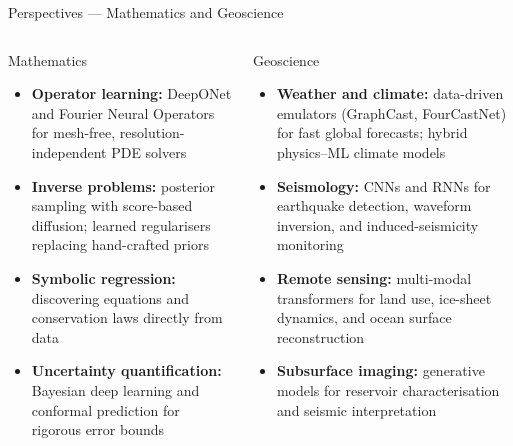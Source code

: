 \documentclass[aspectratio=169,11pt]{beamer}
\begin{document}
\begin{frame}{Perspectives --- Mathematics and Geoscience}
  \begin{columns}[T]
      \begin{block}{Mathematics}
        \begin{itemize}\itemsep2pt
          \item \textbf{Operator learning:}
                DeepONet and Fourier Neural Operators
                for mesh-free, resolution-independent
                PDE solvers
          \item \textbf{Inverse problems:}
                posterior sampling with score-based
                diffusion; learned regularisers
                replacing hand-crafted priors
          \item \textbf{Symbolic regression:}
                discovering equations and conservation
                laws directly from data
          \item \textbf{Uncertainty quantification:}
                Bayesian deep learning and conformal
                prediction for rigorous error bounds
        \end{itemize}
      \end{block}
      \begin{block}{Geoscience}
        \begin{itemize}\itemsep2pt
          \item \textbf{Weather and climate:}
                data-driven emulators (GraphCast,
                FourCastNet) for fast global forecasts;
                hybrid physics--ML climate models
          \item \textbf{Seismology:}
                CNNs and RNNs for earthquake detection,
                waveform inversion, and
                induced-seismicity monitoring
          \item \textbf{Remote sensing:}
                multi-modal transformers for land use,
                ice-sheet dynamics, and
                ocean surface reconstruction
          \item \textbf{Subsurface imaging:}
                generative models for reservoir
                characterisation and seismic
                interpretation
        \end{itemize}
      \end{block}
  \end{columns}
\end{frame}
\end{document}
